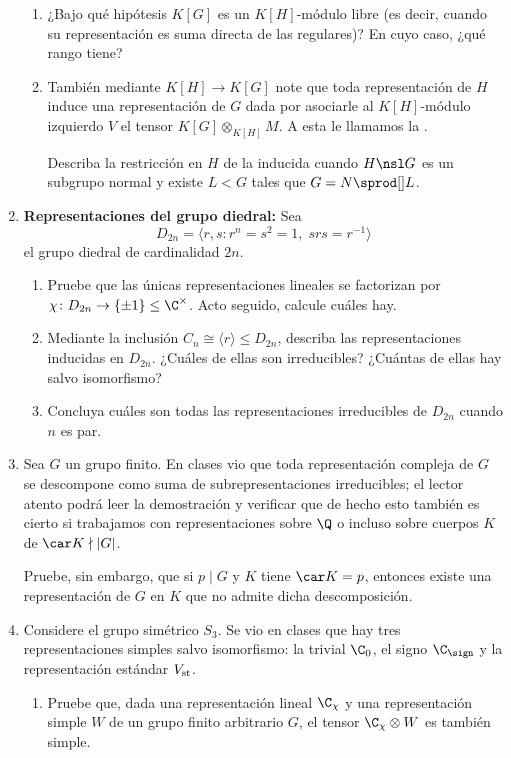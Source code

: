 \documentclass[11pt, reqno]{amsart}
\begin{document}
\begin{enumerate}
\begin{enumerate}
			\item ¿Bajo qué hipótesis $K[G]$ es un $K[H]$-módulo libre (es decir, cuando su representación es suma directa de las regulares)?
				En cuyo caso, ¿qué rango tiene?

			\item También mediante $K[H] \to K[G]$ note que toda representación de $H$ induce una
				representación de $G$ dada por asociarle al $K[H]$-módulo izquierdo $V$ el tensor $K[G]
				\otimes_{K[H]} M$.
				A esta le llamamos la .

				Describa la restricción en $H$ de la inducida cuando $H \nsl G$ es un subgrupo normal y existe $L < G$ tales que $G = N \sprod[] L$.
		\end{enumerate}

		\newex
	\item \textbf{Representaciones del grupo diedral:}
		Sea
		\[
			D_{2n} = \langle r, s : r^n = s^2 = 1, \; srs = r^{-1} \rangle
		\]
		el grupo diedral de cardinalidad $2n$.
		\begin{enumerate}
			\item Pruebe que las únicas representaciones lineales se factorizan por $\chi \colon D_{2n} \to \{ \pm 1 \} \le \C^\times$.
				Acto seguido, calcule cuáles hay.

			\item Mediante la inclusión $C_n \cong \langle r \rangle \le D_{2n}$, describa las representaciones inducidas en $D_{2n}$.
				¿Cuáles de ellas son irreducibles? ¿Cuántas de ellas hay salvo isomorfismo?

			\item Concluya cuáles son todas las representaciones irreducibles de $D_{2n}$ cuando $n$ es par.
		\end{enumerate}
		\nocite{serre:representations}

		\newex
	\item\lookup Sea $G$ un grupo finito.
		En clases vio que toda representación compleja de $G$ se descompone como suma de subrepresentaciones irreducibles;
		el lector atento podrá leer la demostración y verificar que de hecho esto también es cierto si trabajamos con
		representaciones sobre $\Q$ o incluso sobre cuerpos $K$ de $\car K \nmid |G|$.

		Pruebe, sin embargo, que si $p \mid G$ y $K$ tiene $\car K = p$, entonces existe una representación de $G$ en $K$ que no
		admite dicha descomposición.

		\newex
	\item Considere el grupo simétrico $S_3$.
		Se vio en clases que hay tres representaciones simples salvo isomorfismo:
		la trivial $\C_0$, el signo $\C_\sign$ y la representación estándar $V_{\rm st}$.
		\begin{enumerate}
			\item Pruebe que, dada una representación lineal $\C_\chi$ y una representación simple $W$ de un grupo finito
				arbitrario $G$, el tensor $\C_\chi \otimes W$ es también simple.


\end{enumerate}
\end{enumerate}
\end{document}
